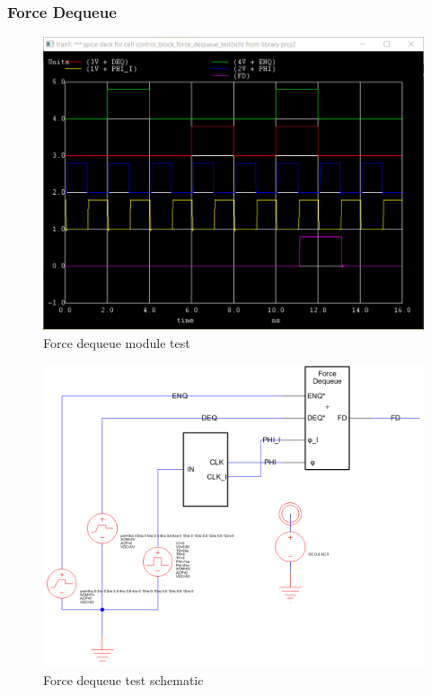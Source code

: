 \documentclass[12pt]{report}
\begin{document}
\subsubsection*{Force Dequeue}
\begin{figure}[H]
  \centering
    \includegraphics[width=1.0\textwidth]{control_block_force_dequeue_test.PNG}
  \caption{Force dequeue module test}
  \label{fig:control_block_force_dequeue_test}
\end{figure}
\begin{figure}[H]
  \centering
    \includegraphics[width=1.0\textwidth]{TestSchematics/force_dequeue.PNG}
  \caption{Force dequeue test schematic}
\end{figure}
\end{document}
